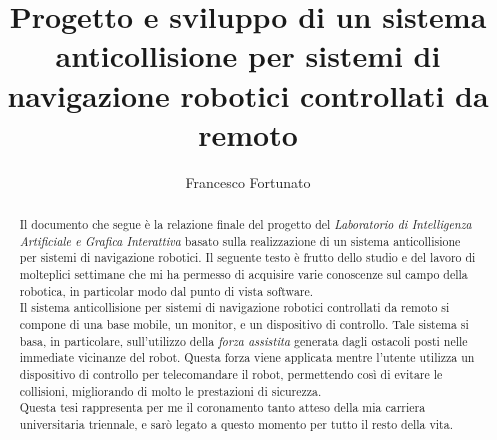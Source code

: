 \documentclass[noexaminfo,oneside,binding=0.6cm]{sapthesis}
\author{Francesco Fortunato}
\title{Progetto e sviluppo di un sistema anticollisione per sistemi di navigazione robotici controllati da remoto}
\begin{document}
	
	\frontmatter
	\setcounter{page}{1}
	\maketitle
	\setcounter{page}{2}
	\dedication{Alla mia famiglia} 
	\setcounter{page}{3}
	\begin{abstract}
		\pagestyle{empty}
		\thispagestyle{empty}
		Il documento che segue è la relazione finale del progetto del \textit{Laboratorio di Intelligenza Artificiale e Grafica Interattiva} basato sulla realizzazione di un sistema anticollisione per sistemi di navigazione robotici. Il seguente testo è frutto dello studio e del lavoro di molteplici settimane che mi ha permesso di acquisire varie conoscenze sul campo della robotica, in particolar modo dal punto di vista software. \\
		
		Il sistema anticollisione per sistemi di navigazione robotici controllati da remoto si compone di una base mobile, un monitor, e un dispositivo di controllo. Tale sistema si basa, in particolare, sull'utilizzo della \textit{forza assistita} generata dagli ostacoli posti nelle immediate vicinanze del robot. Questa forza viene applicata mentre l'utente utilizza un dispositivo di controllo per telecomandare il robot, permettendo così di evitare le collisioni, migliorando di molto le prestazioni di sicurezza.\\
		
		Questa tesi rappresenta per me il coronamento tanto atteso della mia carriera universitaria triennale, e sarò legato a questo momento per tutto il resto della vita.
	\end{abstract}
\end{document}
